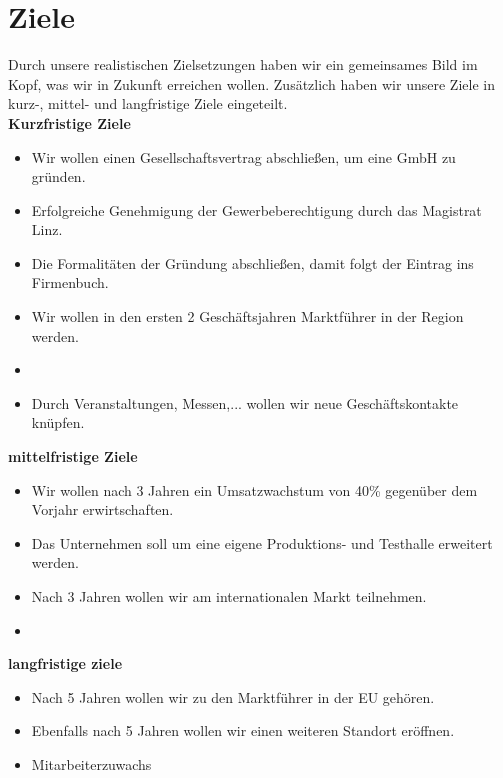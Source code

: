 \section{Ziele}
Durch unsere realistischen Zielsetzungen haben wir ein gemeinsames Bild  im Kopf, was wir in Zukunft erreichen wollen. Zusätzlich haben wir unsere Ziele in kurz-, mittel- und langfristige Ziele eingeteilt. \\ 

\textbf{Kurzfristige Ziele}
\begin{itemize}
	\item Wir wollen einen Gesellschaftsvertrag abschließen, um eine GmbH zu gründen.  %
	\item Erfolgreiche Genehmigung der Gewerbeberechtigung durch das Magistrat Linz. %
	\item Die Formalitäten der Gründung abschließen, damit folgt der Eintrag ins Firmenbuch.  %
	\item Wir wollen in den ersten 2 Geschäftsjahren Marktführer in der Region werden. %
	\item %
	\item Durch Veranstaltungen, Messen,... wollen wir neue Geschäftskontakte knüpfen. \\ %
\end{itemize} 


\textbf{mittelfristige Ziele}
\begin{itemize}
	\item Wir wollen nach 3 Jahren ein Umsatzwachstum von 40\% gegenüber dem Vorjahr erwirtschaften. %
	\item Das Unternehmen soll um eine eigene Produktions- und Testhalle erweitert werden. %
	\item Nach 3 Jahren wollen wir am internationalen Markt teilnehmen. \\ %
	\item 
\end{itemize}

\textbf{langfristige ziele}
\begin{itemize}
	\item Nach 5 Jahren wollen wir zu den Marktführer in der EU gehören.  %
	\item Ebenfalls nach 5 Jahren wollen wir einen weiteren Standort eröffnen. %
	\item Mitarbeiterzuwachs \\%
\end{itemize}


